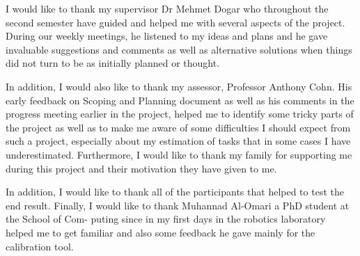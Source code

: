 I would like to thank my supervisor Dr Mehmet Dogar who throughout the second
semester have guided and helped me with several aspects of the project. During our
weekly meetings, he listened to my ideas and plans and he gave invaluable suggestions
and comments as well as alternative solutions when things did not turn to be as initially
planned or thought.

In addition, I would also like to thank my assessor, Professor Anthony Cohn. His early
feedback on Scoping and Planning document as well as his comments in the progress
meeting earlier in the project, helped me to identify some tricky parts of the project
as well as to make me aware of some difficulties I should expect from such a project,
especially about my estimation of tasks that in some cases I have underestimated.
Furthermore, I would like to thank my family for supporting me during this project and
their motivation they have given to me.

In addition, I would like to thank all of the participants that helped to test the end result.
Finally, I would like to thank Muhannad Al-Omari a PhD student at the School of Com-
puting since in my first days in the robotics laboratory helped me to get familiar and also
some feedback he gave mainly for the calibration tool.